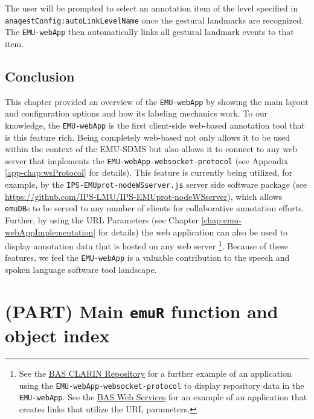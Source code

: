\documentclass[]{book}
\let\rmarkdownfootnote\footnote%
\def\footnote{\protect\rmarkdownfootnote}
\theoremstyle{definition}
\theoremstyle{definition}
\theoremstyle{definition}
\theoremstyle{remark}
\begin{document}
The user will be prompted to select an annotation item of the level
specified in \texttt{anagestConfig:autoLinkLevelName} once the gestural
landmarks are recognized. The \texttt{EMU-webApp} then automatically
links all gestural landmark events to that item.

\hypertarget{conclusion-5}{%
\section{Conclusion}\label{conclusion-5}}

This chapter provided an overview of the \texttt{EMU-webApp} by showing
the main layout and configuration options and how its labeling mechanics
work. To our knowledge, the \texttt{EMU-webApp} is the first client-side
web-based annotation tool that is this feature rich. Being completely
web-based not only allows it to be used within the context of the
EMU-SDMS but also allows it to connect to any web server that implements
the \texttt{EMU-webApp-websocket-protocol} (see Appendix
\ref{app-chap:wsProtocol} for details). This feature is currently being
utilized, for example, by the \texttt{IPS-EMUprot-nodeWSserver.js}
server side software package (see
\url{https://github.com/IPS-LMU/IPS-EMUprot-nodeWSserver}), which allows
\texttt{emuDB}s to be served to any number of clients for collaborative
annotation efforts. Further, by using the URL Parameters (see Chapter
\ref{chap:emu-webAppImplementation} for details) the web application can
also be used to display annotation data that is hosted on any web server
\footnote{See the
  \href{http://hdl.handle.net/11858/00-1779-0000-0006-BF00-E}{BAS CLARIN
  Repository} for a further example of an application using the
  \texttt{EMU-webApp-websocket-protocol} to display repository data in
  the \texttt{EMU-webApp}. See the
  \href{http://hdl.handle.net/11858/00-1779-0000-0028-421B-4}{BAS Web
  Services} for an example of an application that creates links that
  utilize the URL parameters.}. Because of these features, we feel the
\texttt{EMU-webApp} is a valuable contribution to the speech and spoken
language software tool landscape.

\hypertarget{part-main-emur-function-and-object-index}{%
\chapter*{\texorpdfstring{(PART) Main \texttt{emuR} function and object
index}{(PART) Main emuR function and object index}}\label{part-main-emur-function-and-object-index}}
\end{document}
